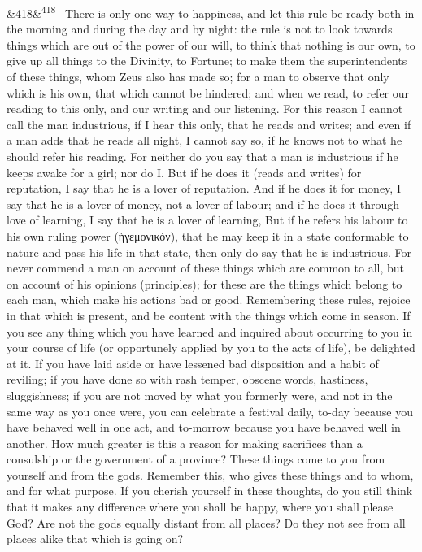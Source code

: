 \documentclass[12pt]{article}
\newcommand{\para}[1][]{\par\noindent\ifx&#1&\else\textsuperscript{\footnotesize #1}~\fi}
\begin{document}
\para[418] There is only one way to happiness, and let this rule be ready both in the morning and during the day and by night: the rule is not to look towards things which are out of the power of our will, to think that nothing is our own, to give up all things to the Divinity, to Fortune; to make them the superintendents of these things, whom Zeus also has made so; for a man to observe that only which is his own, that which cannot be hindered; and when we read, to refer our reading to this only, and our writing and our listening. For this reason I cannot call the man industrious, if I hear this only, that he reads and writes; and even if a man adds that he reads all night, I cannot say so, if he knows not to what he should refer his reading. For neither do you say that a man is industrious if he keeps awake for a girl; nor do I. But if he does it (reads and writes) for reputation, I say that he is a lover of reputation. And if he does it for money, I say that he is a lover of money, not a lover of labour; and if he does it through love of learning, I say that he is a lover of learning, But if he refers his labour to his own ruling power (ἡγεμονικόν), that he may keep it in a state conformable to nature and pass his life in that state, then only do say that he is industrious. For never commend a man on account of these things which are common to all, but on account of his opinions (principles); for these are the things which belong to each man, which make his actions bad or good. Remembering these rules, rejoice in that which is present, and be content with the things which come in season. If you see any thing which you have learned and inquired about occurring to you in your course of life (or opportunely applied by you to the acts of life), be delighted at it. If you have laid aside or have lessened bad disposition and a habit of reviling; if you have done so with rash temper, obscene words, hastiness, sluggishness; if you are not moved by what you formerly were, and not in the same way as you once were, you can celebrate a festival daily, to-day because you have behaved well in one act, and to-morrow because you have behaved well in another. How much greater is this a reason for making sacrifices than a consulship or the government of a province? These things come to you from yourself and from the gods. Remember this, who gives these things and to whom, and for what purpose. If you cherish yourself in these thoughts, do you still think that it makes any difference where you shall be happy, where you shall please God? Are not the gods equally distant from all places? Do they not see from all places alike that which is going on?
\end{document}
